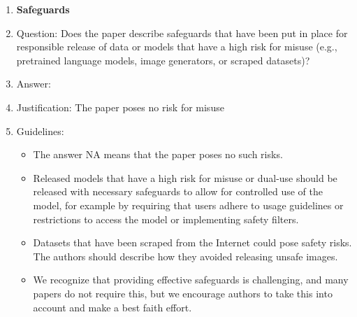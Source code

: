 \documentclass{article}
\begin{document}
\begin{enumerate}
\item {\bf Safeguards}
    \item[] Question: Does the paper describe safeguards that have been put in place for responsible release of data or models that have a high risk for misuse (e.g., pretrained language models, image generators, or scraped datasets)?
    \item[] Answer: \answerNA{} %
    \item[] Justification: The paper poses no risk for misuse
    \item[] Guidelines:
    \begin{itemize}
        \item The answer NA means that the paper poses no such risks.
        \item Released models that have a high risk for misuse or dual-use should be released with necessary safeguards to allow for controlled use of the model, for example by requiring that users adhere to usage guidelines or restrictions to access the model or implementing safety filters. 
        \item Datasets that have been scraped from the Internet could pose safety risks. The authors should describe how they avoided releasing unsafe images.
        \item We recognize that providing effective safeguards is challenging, and many papers do not require this, but we encourage authors to take this into account and make a best faith effort.
    \end{itemize}


\end{enumerate}
\end{document}
